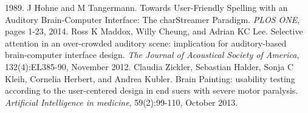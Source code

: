 \documentclass[10pt]{article}
\begin{document}
\begin{spacing}{.865}
{\begin{thebibliography}{99}
        1989.
     J Hohne and M Tangermann. Towards
        User-Friendly Spelling with an Auditory Brain-Computer
        Interface: The charStreamer Paradigm. \emph{PLOS ONE},
        pages 1-23, 2014.
     Ross K Maddox, Willy Cheung, and
        Adrian KC Lee. Selective attention in an over-crowded
        auditory scene: implication for auditory-based
        brain-computer interface design. \emph{The Journal of
        Acoustical Society of America}, 132(4):EL385-90,
        November 2012.
     Claudia Zickler, Sebastian Halder,
        Sonja C Kleih, Cornelia Herbert, and Andrea Kubler.
        Brain Painting: usability testing according to the
        user-centered design in end suers with severe motor
        paralysis. \emph{Artificial Intelligence in medicine},
        59(2):99-110, October 2013.
\end{thebibliography}}

\end{spacing}
%
\end{document}
